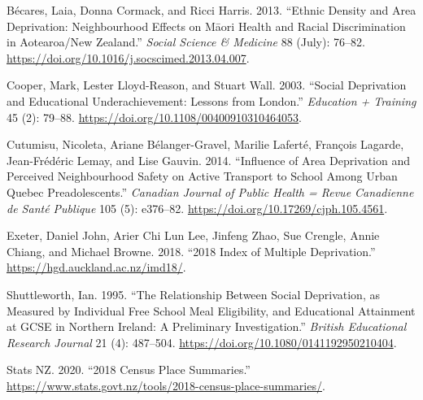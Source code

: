 \documentclass[
  letterpaper,
  DIV=11,
  numbers=noendperiod,
  oneside]{scrartcl}
\newlength{\cslhangindent}
\newlength{\cslentryspacingunit} %
\newenvironment{CSLReferences}[2] %
 {%
  \setlength{\parindent}{0pt}
  \ifodd #1
  \let\oldpar\par
  \def\par{\hangindent=\cslhangindent\oldpar}
  \fi
  \setlength{\parskip}{#2\cslentryspacingunit}
 }%
 {}
\begin{document}
\hypertarget{refs}{}
\begin{CSLReferences}{1}{0}
\leavevmode{}%
Bécares, Laia, Donna Cormack, and Ricci Harris. 2013. {``Ethnic Density
and Area Deprivation: Neighbourhood Effects on M{ā}ori Health and Racial
Discrimination in Aotearoa/New Zealand.''} \emph{Social Science \&
Medicine} 88 (July): 76--82.
\url{https://doi.org/10.1016/j.socscimed.2013.04.007}.

\leavevmode{}%
Cooper, Mark, Lester Lloyd-Reason, and Stuart Wall. 2003. {``Social
Deprivation and Educational Underachievement: Lessons from London.''}
\emph{Education + Training} 45 (2): 79--88.
\url{https://doi.org/10.1108/00400910310464053}.

\leavevmode{}%
Cutumisu, Nicoleta, Ariane Bélanger-Gravel, Marilie Laferté, François
Lagarde, Jean-Frédéric Lemay, and Lise Gauvin. 2014. {``Influence of
Area Deprivation and Perceived Neighbourhood Safety on Active Transport
to School Among Urban Quebec Preadolescents.''} \emph{Canadian Journal
of Public Health = Revue Canadienne de Santé Publique} 105 (5):
e376--82. \url{https://doi.org/10.17269/cjph.105.4561}.

\leavevmode{}%
Exeter, Daniel John, Arier Chi Lun Lee, Jinfeng Zhao, Sue Crengle, Annie
Chiang, and Michael Browne. 2018. {``2018 Index of Multiple
Deprivation.''} \url{https://hgd.auckland.ac.nz/imd18/}.

\leavevmode{}%
Shuttleworth, Ian. 1995. {``The Relationship Between Social Deprivation,
as Measured by Individual Free School Meal Eligibility, and Educational
Attainment at GCSE in Northern Ireland: A Preliminary Investigation.''}
\emph{British Educational Research Journal} 21 (4): 487--504.
\url{https://doi.org/10.1080/0141192950210404}.

\leavevmode{}%
Stats NZ. 2020. {``2018 Census Place Summaries.''}
\url{https://www.stats.govt.nz/tools/2018-census-place-summaries/}.

\end{CSLReferences}
\end{document}
